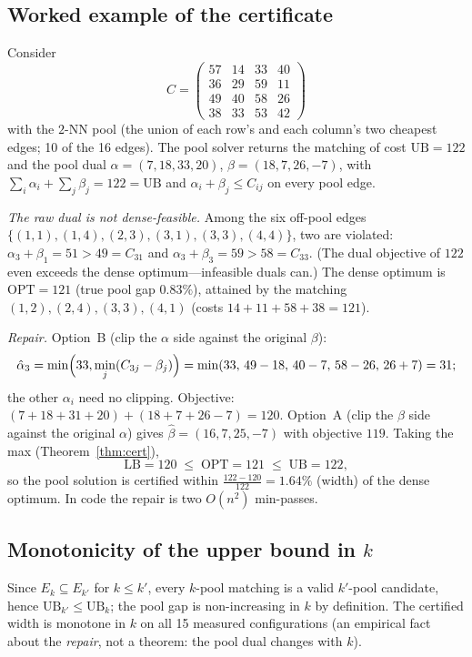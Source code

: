 \documentclass[11pt]{article}
\theoremstyle{remark}
\begin{document}
\subsection{Worked example of the certificate}
\label{app:example}
{\sloppypar
Consider
\[
C=\begin{pmatrix}
57&14&33&40\\
36&29&59&11\\
49&40&58&26\\
38&33&53&42
\end{pmatrix}
\]
with the $2$-NN pool (the union of each row's and each column's two
cheapest edges; 10 of the 16 edges). The pool solver returns the matching
of cost $\mathrm{UB}=122$ and the pool dual
$\alpha=(7,18,33,20)$, $\beta=(18,7,26,-7)$, with
$\sum_i\alpha_i+\sum_j\beta_j=122=\mathrm{UB}$ and
$\alpha_i+\beta_j\le C_{ij}$ on every pool edge.

\emph{The raw dual is not dense-feasible.} Among the six off-pool edges
$\{(1,1),(1,4),(2,3),(3,1),(3,3),(4,4)\}$, two are violated:
$\alpha_3+\beta_1=51>49=C_{31}$ and $\alpha_3+\beta_3=59>58=C_{33}$.
(The dual objective of $122$ even exceeds the dense optimum---infeasible
duals can.) The dense optimum is $\mathrm{OPT}=121$ (true pool gap
$0.83\%$), attained by the matching $(1,2),(2,4),(3,3),(4,1)$ (costs
$14+11+58+38=121$).

\emph{Repair.} Option~B (clip the $\alpha$ side against the original
$\beta$):
\[
\hat\alpha_3=\min\Bigl(33,\min_j(C_{3j}-\beta_j)\Bigr)
=\min(33,\,49-18,\,40-7,\,58-26,\,26+7)=31;
\]
the other $\alpha_i$ need no clipping. Objective:
$(7+18+31+20)+(18+7+26-7)=120$. Option~A (clip the $\beta$ side against
the original $\alpha$) gives $\hat\beta=(16,7,25,-7)$ with objective
$119$. Taking the max (Theorem~\ref{thm:cert}),
\[
\mathrm{LB}=120\;\le\;\mathrm{OPT}=121\;\le\;\mathrm{UB}=122,
\]
so the pool solution is certified within $\frac{122-120}{122}=1.64\%$
(width) of the dense optimum. In code the repair is two $O(n^2)$ min-passes.
\par}

\subsection{Monotonicity of the upper bound in $k$}
Since $E_k\subseteq E_{k'}$ for $k\le k'$, every $k$-pool matching is a
valid $k'$-pool candidate, hence
$\mathrm{UB}_{k'}\le \mathrm{UB}_k$; the pool gap is non-increasing in $k$
by definition. The certified width is monotone in $k$ on all 15 measured
configurations (an empirical fact about the \emph{repair}, not a theorem:
the pool dual changes with $k$).
\end{document}
